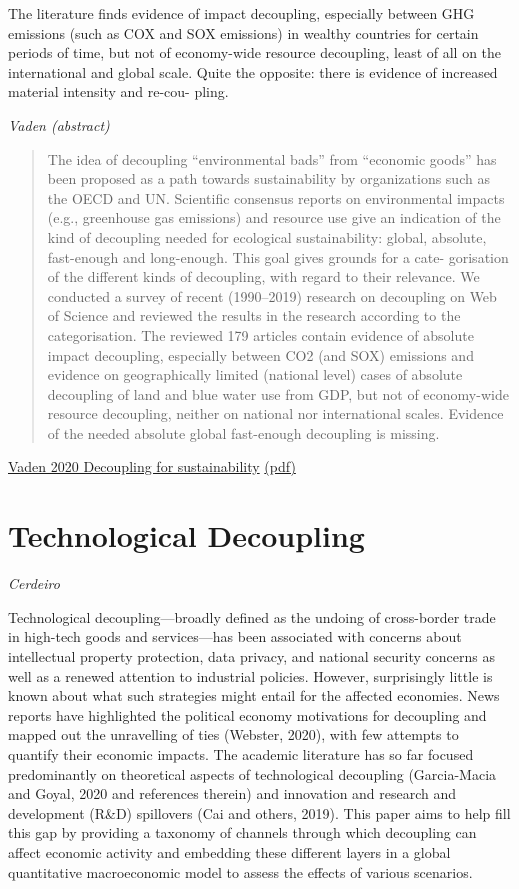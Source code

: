 \documentclass[
]{book}
\begin{document}
The literature finds evidence of impact decoupling, especially
between GHG emissions (such as COX and SOX emissions) in wealthy
countries for certain periods of time, but not of economy-wide resource
decoupling, least of all on the international and global scale. Quite the
opposite: there is evidence of increased material intensity and re-cou-
pling.

\emph{Vaden (abstract)}

\begin{quote}
The idea of decoupling ``environmental bads'' from ``economic goods'' has been proposed as a path towards
sustainability by organizations such as the OECD and UN. Scientific consensus reports on environmental impacts
(e.g., greenhouse gas emissions) and resource use give an indication of the kind of decoupling needed for
ecological sustainability: global, absolute, fast-enough and long-enough. This goal gives grounds for a cate-
gorisation of the different kinds of decoupling, with regard to their relevance. We conducted a survey of recent
(1990--2019) research on decoupling on Web of Science and reviewed the results in the research according to the
categorisation. The reviewed 179 articles contain evidence of absolute impact decoupling, especially between
CO2 (and SOX) emissions and evidence on geographically limited (national level) cases of absolute decoupling of
land and blue water use from GDP, but not of economy-wide resource decoupling, neither on national nor
international scales. Evidence of the needed absolute global fast-enough decoupling is missing.
\end{quote}

\href{https://www.sciencedirect.com/science/article/pii/S1462901120304342}{Vaden 2020 Decoupling for sustainability}
\href{/pdf/Vaden_2020_Decoupling_Review.pdf}{(pdf)}

\hypertarget{technological-decoupling}{%
\section{Technological Decoupling}\label{technological-decoupling}}

\emph{Cerdeiro}

Technological decoupling---broadly defined as the undoing of cross-border trade in high-tech
goods and services---has been associated with concerns about intellectual property protection,
data privacy, and national security concerns as well as a renewed attention to industrial policies.
However, surprisingly little is known about what such strategies might entail for the affected
economies. News reports have highlighted the political economy motivations for decoupling and
mapped out the unravelling of ties (Webster, 2020), with few attempts to quantify their economic
impacts. The academic literature has so far focused predominantly on theoretical aspects of
technological decoupling (Garcia-Macia and Goyal, 2020 and references therein) and innovation
and research and development (R\&D) spillovers (Cai and others, 2019). This paper aims to help
fill this gap by providing a taxonomy of channels through which decoupling can affect economic
activity and embedding these different layers in a global quantitative macroeconomic model to
assess the effects of various scenarios.
\end{document}
